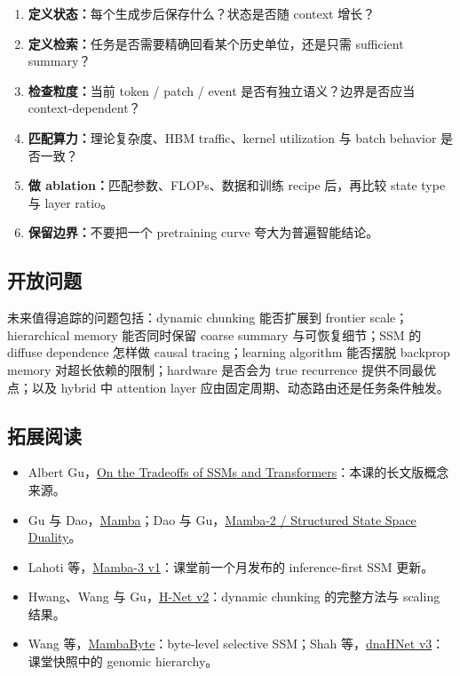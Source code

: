 \begin{enumerate}
  \item \textbf{定义状态：}每个生成步后保存什么？状态是否随 context 增长？
  \item \textbf{定义检索：}任务是否需要精确回看某个历史单位，还是只需 sufficient summary？
  \item \textbf{检查粒度：}当前 token / patch / event 是否有独立语义？边界是否应当 context-dependent？
  \item \textbf{匹配算力：}理论复杂度、HBM traffic、kernel utilization 与 batch behavior 是否一致？
  \item \textbf{做 ablation：}匹配参数、FLOPs、数据和训练 recipe 后，再比较 state type 与 layer ratio。
  \item \textbf{保留边界：}不要把一个 pretraining curve 夸大为普遍智能结论。
\end{enumerate}

\subsection{开放问题}

未来值得追踪的问题包括：dynamic chunking 能否扩展到 frontier scale；hierarchical memory 能否同时保留 coarse summary 与可恢复细节；SSM 的 diffuse dependence 怎样做 causal tracing；learning algorithm 能否摆脱 backprop memory 对超长依赖的限制；hardware 是否会为 true recurrence 提供不同最优点；以及 hybrid 中 attention layer 应由固定周期、动态路由还是任务条件触发。

\subsection{拓展阅读}

\begin{itemize}
  \item Albert Gu，\href{https://goombalab.github.io/blog/2025/tradeoffs/}{On the Tradeoffs of SSMs and Transformers}：本课的长文版概念来源。
  \item Gu 与 Dao，\href{https://arxiv.org/abs/2312.00752}{Mamba}；Dao 与 Gu，\href{https://arxiv.org/abs/2405.21060}{Mamba-2 / Structured State Space Duality}。
  \item Lahoti 等，\href{https://arxiv.org/abs/2603.15569v1}{Mamba-3 v1}：课堂前一个月发布的 inference-first SSM 更新。
  \item Hwang、Wang 与 Gu，\href{https://arxiv.org/abs/2507.07955v2}{H-Net v2}：dynamic chunking 的完整方法与 scaling 结果。
  \item Wang 等，\href{https://arxiv.org/abs/2401.13660}{MambaByte}：byte-level selective SSM；Shah 等，\href{https://arxiv.org/abs/2602.10603v3}{dnaHNet v3}：课堂快照中的 genomic hierarchy。
\end{itemize}


